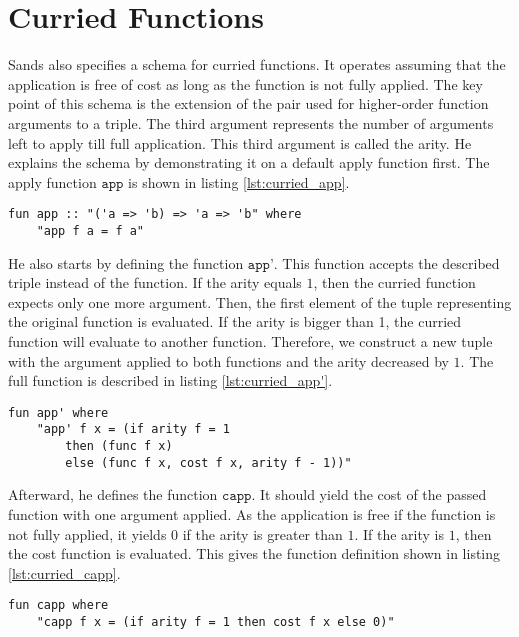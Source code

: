 
\section{Curried Functions} \label{chapter:rel_curried}

Sands also specifies a schema for curried functions.
It operates assuming that the application is free of cost as long as the function is not fully applied.
The key point of this schema is the extension of the pair used for higher-order function arguments to a triple.
The third argument represents the number of arguments left to apply till full application.
This third argument is called the arity.
He explains the schema by demonstrating it on a default apply function first.
The apply function $\texttt{app}$ is shown in listing \ref{lst:curried_app}.
\begin{lstlisting}[language=isabelle,mathescape=true,caption=Apply function,label=lst:curried_app]
  fun app :: "('a => 'b) => 'a => 'b" where
    "app f a = f a"
\end{lstlisting}

He also starts by defining the function $\texttt{app'}$.
This function accepts the described triple instead of the function.
If the arity equals $1$, then the curried function expects only one more argument.
Then, the first element of the tuple representing the original function is evaluated.
If the arity is bigger than 1, the curried function will evaluate to another function.
Therefore, we construct a new tuple with the argument applied to both functions and the arity decreased by $1$.
The full function is described in listing \ref{lst:curried_app'}.
\begin{lstlisting}[language=isabelle,mathescape=true,label=lst:curried_app',caption=Apply function on function argument triple]
  fun app' where
    "app' f x = (if arity f = 1
        then (func f x)
        else (func f x, cost f x, arity f - 1))"
\end{lstlisting}

Afterward, he defines the function $\texttt{capp}$.
It should yield the cost of the passed function with one argument applied.
As the application is free if the function is not fully applied, it yields $0$ if the arity is greater than $1$.
If the arity is $1$, then the cost function is evaluated.
This gives the function definition shown in listing \ref{lst:curried_capp}.
\begin{lstlisting}[language=isabelle,mathescape=true,caption=Timing function of apply function,label=lst:curried_capp]
  fun capp where
    "capp f x = (if arity f = 1 then cost f x else 0)"
\end{lstlisting}

